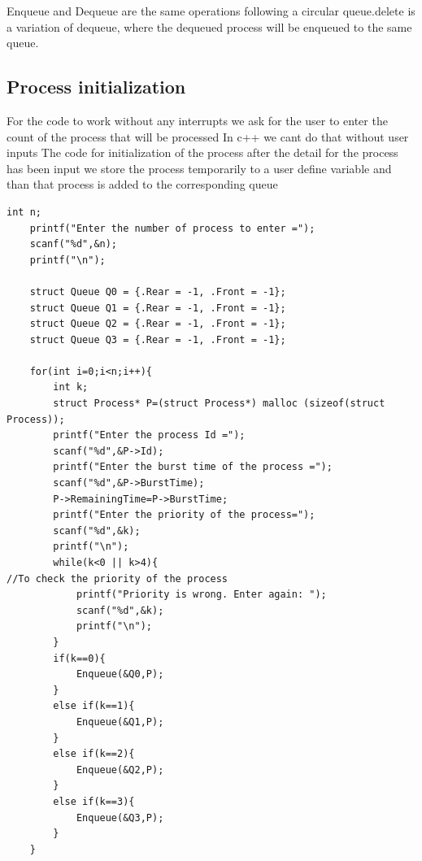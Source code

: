 \documentclass{article}
\begin{document}
\newpage
Enqueue and Dequeue are the same operations following a circular queue.delete is a variation of dequeue, where the dequeued process will be enqueued to the same queue.

\vspace{\baselineskip}
\subsection{Process initialization}
\vspace{\baselineskip}

For the code to work without any interrupts we ask for the user to enter the count of the process that will be processed In c++ we cant do that without user inputs 
The code for initialization of the process after the detail for the process has been input we store the process temporarily to a user define variable and than that process is added to the corresponding queue

\begin{lstlisting}
int n;
    printf("Enter the number of process to enter =");
    scanf("%d",&n);
    printf("\n");

    struct Queue Q0 = {.Rear = -1, .Front = -1};
    struct Queue Q1 = {.Rear = -1, .Front = -1};
    struct Queue Q2 = {.Rear = -1, .Front = -1};
    struct Queue Q3 = {.Rear = -1, .Front = -1};

    for(int i=0;i<n;i++){
        int k;
        struct Process* P=(struct Process*) malloc (sizeof(struct Process));
        printf("Enter the process Id =");
        scanf("%d",&P->Id);
        printf("Enter the burst time of the process =");
        scanf("%d",&P->BurstTime);
        P->RemainingTime=P->BurstTime;
        printf("Enter the priority of the process=");
        scanf("%d",&k);
        printf("\n");
        while(k<0 || k>4){                                                               //To check the priority of the process
            printf("Priority is wrong. Enter again: ");
            scanf("%d",&k);
            printf("\n");
        }
        if(k==0){
            Enqueue(&Q0,P);
        }
        else if(k==1){
            Enqueue(&Q1,P);
        }
        else if(k==2){
            Enqueue(&Q2,P);
        }
        else if(k==3){
            Enqueue(&Q3,P);
        }
    }
\end{lstlisting}
\end{document}
